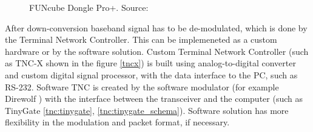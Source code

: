 \begin{minipage}{\linewidth}
\begin{minipage}{0.45\linewidth}
\begin{figure}[H]
            \caption{FUNcube Dongle Pro+. Source: \cite{funcube}}
            \label{funcube}
        \end{figure}
    \end{minipage}
\end{minipage}

After down-conversion baseband signal has to be de-modulated, which is done by the Terminal Network Controller. This can be implemeneted as a custom hardware or by the software solution. Custom Terminal Network Controller (such as TNC-X shown in the figure \ref{tncx}) is built using analog-to-digital converter and custom digital signal processor, with the data interface to the PC, such as RS-232. Software TNC is created by the software modulator (for example Direwolf \cite{direwolf}) with the interface between the transceiver and the computer (such as TinyGate \ref{tnc:tinygate}, \ref{tnc:tinygate_schema}). Software solution has more flexibility in the modulation and packet format, if necessary.

